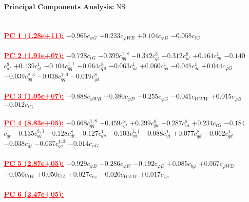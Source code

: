 \documentclass{article}
\begin{document}
\noindent \underline{\bf{Principal Components Analysis}:} NS\\ \\ \\
\noindent \textcolor{red}{\underline{\bf{PC 1} (1.28e+11):}}
{$-0.965$}{\rm $c_{\varphi G}$}
{$+0.233$}{\rm $c_{\varphi WB}$}
{$+0.104$}{\rm $c_{\varphi D}$}
{$-0.058$}{\rm $c_{tG}$}
 \nonumber \\ \nonumber \\
\noindent \textcolor{red}{\underline{\bf{PC 2} (1.91e+07):}}
{$-0.728$}{\rm $c_{tG}$}
{$-0.399$}{\rm $c_{qq}^{1,8}$}
{$-0.342$}{\rm $c_{qt}^{8}$}
{$-0.312$}{\rm $c_{ut}^{8}$}
{$+0.164$}{\rm $c_{qu}^{1}$}
{$-0.140$}{\rm $c_{dt}^{8}$}
{$+0.139$}{\rm $c_{qt}^{1}$}
{$-0.104$}{\rm $c_{qq}^{1,1}$}
{$-0.064$}{\rm $c_{qu}^{8}$}
{$-0.063$}{\rm $c_{ut}^{1}$}
{$+0.060$}{\rm $c_{qd}^{1}$}
{$-0.045$}{\rm $c_{dt}^{1}$}
{$+0.044$}{\rm $c_{\varphi G}$}
{$-0.039$}{\rm $c_{qq}^{8,3}$}
{$-0.038$}{\rm $c_{qq}^{1,3}$}
{$-0.019$}{\rm $c_{qd}^{8}$}
 \nonumber \\ \nonumber \\
\noindent \textcolor{red}{\underline{\bf{PC 3} (1.05e+07):}}
{$-0.888$}{\rm $c_{\varphi WB}$}
{$-0.380$}{\rm $c_{\varphi D}$}
{$-0.255$}{\rm $c_{\varphi G}$}
{$-0.041$}{\rm $c_{WWW}$}
{$+0.015$}{\rm $c_{\varphi B}$}
{$-0.012$}{\rm $c_{tG}$}
 \nonumber \\ \nonumber \\
\noindent \textcolor{red}{\underline{\bf{PC 4} (8.83e+05):}}
{$-0.668$}{\rm $c_{qq}^{1,8}$}
{$+0.459$}{\rm $c_{qt}^{8}$}
{$+0.299$}{\rm $c_{qu}^{8}$}
{$-0.287$}{\rm $c_{ut}^{8}$}
{$+0.234$}{\rm $c_{tG}$}
{$-0.184$}{\rm $c_{qt}^{1}$}
{$-0.135$}{\rm $c_{qq}^{8,3}$}
{$-0.128$}{\rm $c_{dt}^{8}$}
{$-0.127$}{\rm $c_{qu}^{1}$}
{$-0.103$}{\rm $c_{qq}^{1,1}$}
{$-0.088$}{\rm $c_{ut}^{1}$}
{$+0.077$}{\rm $c_{qd}^{8}$}
{$-0.062$}{\rm $c_{qd}^{1}$}
{$-0.038$}{\rm $c_{dt}^{1}$}
{$-0.037$}{\rm $c_{qq}^{1,3}$}
{$-0.014$}{\rm $c_{\varphi G}$}
 \nonumber \\ \nonumber \\
\noindent \textcolor{red}{\underline{\bf{PC 5} (2.87e+05):}}
{$-0.929$}{\rm $c_{\varphi B}$}
{$-0.286$}{\rm $c_{\varphi W}$}
{$-0.192$}{\rm $c_{\varphi D}$}
{$+0.085$}{\rm $c_{b \varphi}$}
{$+0.067$}{\rm $c_{\varphi WB}$}
{$-0.056$}{\rm $c_{tW}$}
{$+0.050$}{\rm $c_{tZ}$}
{$+0.027$}{\rm $c_{c \varphi}$}
{$-0.020$}{\rm $c_{WWW}$}
{$+0.017$}{\rm $c_{\tau \varphi}$}
 \nonumber \\ \nonumber \\
\noindent \textcolor{red}{\underline{\bf{PC 6} (2.47e+05):}}
\end{document}
